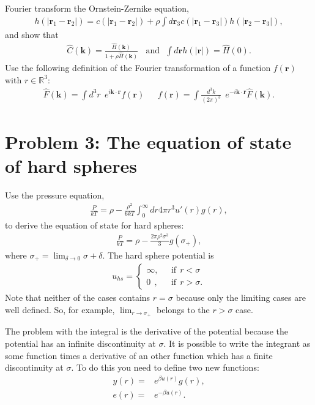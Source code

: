 \documentclass[paper=a4, fontsize=11pt]{scrartcl} %
\numberwithin{equation}{section} %
\numberwithin{figure}{section} %
\numberwithin{table}{section} %
\begin{document}
Fourier transform the Ornstein-Zernike equation,
\begin{align*}
 h(|\mathbf{r}_1 - \mathbf{r}_2|)=c(|\mathbf{r}_1-\mathbf{r}_2|) +
 \rho \int d\mathbf{r}_3 c(|\mathbf{r}_1-\mathbf{r}_3|)  h(|\mathbf{r}_2 - \mathbf{r}_3|),
\end{align*}
and show that
\begin{align*}
 \hat{C}(\mathbf{k}) = \frac{\hat{H}(\mathbf{k})}{1+\rho \hat{H}(\mathbf{k})}
\ \ \ \ \text{and} \ \ \ 
 \int d\mathbf{r} h(|\mathbf{r}|) = \hat{H}(0).
\end{align*}
Use the following definition of the Fourier transformation of a function $f(\mathbf{r})$ with $r\in \mathbb{R}^3$:
\begin{align*}
 \hat{F}(\mathbf{k}) = \int d^3 r \ \  e^{i \mathbf{k} \cdot \mathbf{r}} f(\mathbf{r}) \ \ \ \ \ \ \
  f(\mathbf{r}) = \int \frac{d^3k}{(2 \pi)^3}\ \  e^{-i \mathbf{k} \cdot \mathbf{r}} \hat{F}(\mathbf{k}) .
\end{align*}





\section*{Problem 3: The equation of state of hard spheres}
Use the pressure equation,
\begin{align*}
 \frac{P}{k T} = \rho - \frac{\rho^2}{6kT} \int_0^\infty dr 4 \pi r^3 u'(r)g(r),
\end{align*}
to derive the equation of state for hard spheres:
\begin{align*}
 \frac{P}{k T} = \rho - \frac{2 \pi \rho^2 \sigma^3}{3} g(\sigma_+),
\end{align*}
where $\sigma_+=\lim_{\delta\to 0} \sigma + \delta$. 
The hard sphere potential is
\begin{align*}
u_{hs} = 
 \begin{cases}
  \infty,& \ \ \ \text{if}\ \  r<\sigma\\
   0\ \ ,& \ \ \ \text{if}\ \  r>\sigma.
 \end{cases}
\end{align*}
Note that neither of the cases contains $r=\sigma$ because only the limiting cases are well defined.
So, for example, $\lim_{r\to\sigma_+}$ belongs to the $r>\sigma$ case.

The problem with the integral is the derivative of the potential because the potential has an infinite discontinuity
at $\sigma$. It is possible to write the integrant as some function times a derivative of an other 
function which has a finite discontinuity at $\sigma$.
To do this you need to define two new functions:
\begin{align*}
 y(r) = & e^{\beta u(r)}g(r), \\
 e(r) = & e^{-\beta u(r)}.
\end{align*}



\end{document}
